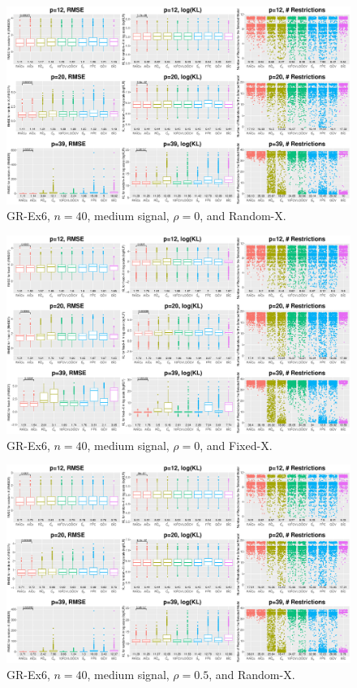 \clearpage
\begin{figure}[!ht]
\centering
\includegraphics[width=\textwidth]{figures/supplement/randomx_GR-Ex6_n40_msnr_rho0.eps}
\caption{GR-Ex6, $n=40$, medium signal, $\rho=0$, and Random-X.}
\end{figure}
\begin{figure}[!ht]
\centering
\includegraphics[width=\textwidth]{figures/supplement/fixedx_GR-Ex6_n40_msnr_rho0.eps}
\caption{GR-Ex6, $n=40$, medium signal, $\rho=0$, and Fixed-X.}
\end{figure}
\clearpage
\begin{figure}[!ht]
\centering
\includegraphics[width=\textwidth]{figures/supplement/randomx_GR-Ex6_n40_msnr_rho05.eps}
\caption{GR-Ex6, $n=40$, medium signal, $\rho=0.5$, and Random-X.}
\end{figure}

